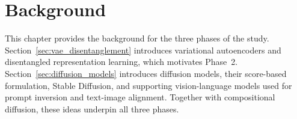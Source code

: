 
\chapter{Background}
\label{chap:background}

This chapter provides the background for the three phases of the study.
Section~\ref{sec:vae_disentanglement} introduces variational autoencoders and disentangled
representation learning, which motivates Phase~2. Section~\ref{sec:diffusion_models}
introduces diffusion models, their score-based formulation, Stable Diffusion, and
supporting vision-language models used for prompt inversion and text-image alignment.
Together with compositional diffusion, these ideas underpin all three phases.





% 
